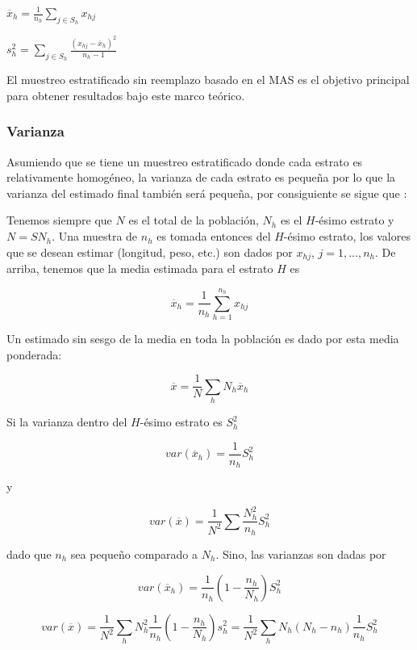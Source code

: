 \documentclass[conference]{IEEEtran}
\begin{document}
\bigbreak

$\overline{x}_h = \frac{1}{n_h} \sum \limits_{j \in S_h} x_{hj}$

\bigbreak

$s^2_h = \sum \limits_{j \in S_h} \frac{(x_{hj} - \overline{x}_h)^2}{n_h - 1}$

\bigbreak

El muestreo estratificado sin reemplazo basado en el MAS es el objetivo principal para obtener resultados bajo este marco teórico.

\subsubsection{Varianza}

Asumiendo que se tiene un muestreo estratificado donde cada estrato es relativamente homogéneo, la varianza de cada estrato es pequeña por lo que la varianza del estimado final también será pequeña, por consiguiente se sigue que \cite{gulland-1966}:

\bigbreak

Tenemos siempre que $N$ es el total de la población, $N_h$ es el $H$-ésimo estrato y $N=SN_h$. Una muestra de $n_h$ es tomada entonces del $H$-ésimo estrato, los valores que se desean estimar (longitud, peso, etc.) son dados por $x_{hj}$, $j=1,...,n_h$. De arriba, tenemos que la media estimada para el estrato $H$ es

$$
\overline{x}_h = \frac{1}{n_h} \sum \limits_{h=1}^{n_h} x_{hj}
$$

Un estimado sin sesgo de la media en toda la población es dado por esta media ponderada:

$$
\overline{x} = \frac{1}{N} \sum \limits_{h} N_h \overline{x}_h
$$

Si la varianza dentro del $H$-ésimo estrato es $S_h^2$

$$
var(\overline{x}_h) = \frac{1}{n_h} S_h^2
$$

y

$$
var(\overline{x}) = \frac{1}{N^2} \sum \frac{N_h^2}{n_h}S_h^2
$$

dado que $n_h$ sea pequeño comparado a $N_h$. Sino, las varianzas son dadas por

$$
var(\overline{x}_h) = \frac{1}{n_h}(1 - \frac{n_h}{N_h})S_h^2
$$


$$
var(\overline{x}) = \frac{1}{N^2} \sum \limits_h N_h^2 \frac{1}{n_h}(1 - \frac{n_h}{N_h})s_h^2 = \frac{1}{N^2} \sum \limits_h N_h (N_h - n_h) \frac{1}{n_h} S_h^2
$$
\end{document}
